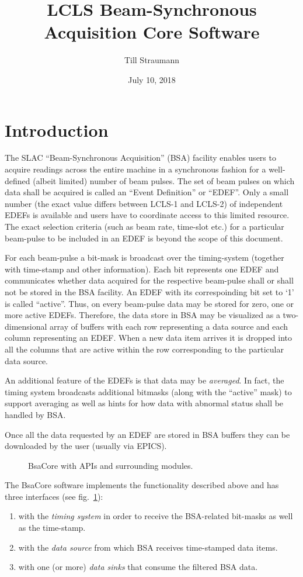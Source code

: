 \documentclass[11pt]{article}
\title{LCLS Beam-Synchronous Acquisition Core Software}
\author{Till Straumann}
\date{July 10, 2018}
\newcommand{\bsac}{BsaCore}
\newcommand{\bsa} {BSA}
\newcommand{\slac}{SLAC}
\newcommand{\EDEF}{EDEF}
\newcounter{figs}
\newcommand{\fig}[3][0]{
\refstepcounter{figs}
\hfill\resizebox{#2}{!}{
        \rotatebox{#1}{\texttt{[image: \#3]}}}\hspace*{\fill}
}
\begin{document}
\maketitle
\section{Introduction}
The \slac{} ``Beam-Synchronous Acquisition'' (\bsa) facility enables users to acquire
readings across the entire machine in a synchronous fashion for a well-defined (albeit
limited) number of beam pulses. The set of beam pulses on which data shall be acquired
is called an ``Event Definition'' or ``{\EDEF}''. Only a small number (the exact value differs
between LCLS-1 and LCLS-2) of independent \EDEF{}s is available and users have to
coordinate access to this limited resource. The exact selection criteria (such as
beam rate, time-slot etc.) for a particular beam-pulse to be included in an \EDEF{} is beyond
the scope of this document.

For each beam-pulse a bit-mask is broadcast over the timing-system (together with time-stamp
and other information). Each bit represents one \EDEF{} and communicates whether data acquired
for the respective beam-pulse shall or shall not be stored in the \bsa{} facility. An \EDEF{} 
with its correspoinding bit set to `1' is called ``active''. Thus,
on every beam-pulse data may be stored for zero, one or more active \EDEF{}s. Therefore, the data
store in \bsa{} may be visualized as a two-dimensional array of buffers with each row
representing a data source and each column representing an \EDEF. When a new data item
arrives it is dropped into all the columns that are active within the row corresponding
to the particular data source.

An additional feature of the \EDEF{}s is that data may be {\em averaged}. In fact, the 
timing system broadcasts additional bitmasks (along with the ``active'' mask) to support
averaging as well as hints for how data with abnormal status shall be handled by \bsa.

Once all the data requested by an \EDEF{} are stored in \bsa{} buffers they can be downloaded
by the user (usually via EPICS).

\begin{figure}
\fig{0.5\textwidth}{fig_blkdiag.eps}
\label{fig:bdiag}
\caption{\bsac{} with APIs and surrounding modules.}
\end{figure}


The \bsac{} software implements the functionality described above and has three
interfaces (see fig.~\ref{fig:bdiag}):
\begin{enumerate}
\item with the {\em timing system} in order to receive the \bsa-related bit-masks as well as
      the time-stamp.
\item with the {\em data source} from which \bsa{} receives time-stamped data items.
\item with one (or more) {\em data sinks} that consume the filtered \bsa{} data.
\end{enumerate}
\end{document}

